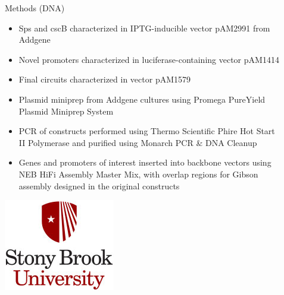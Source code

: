 \documentclass[final]{beamer}
\newlength{\sepwid}
\newlength{\onecolwid}
\newlength{\twocolwid}
\begin{document}
\begin{frame}[t]
\begin{columns}[t]
\begin{column}{\twocolwid}
\begin{columns}[t,totalwidth=\twocolwid]
\begin{column}{\onecolwid}
\begin{block}{Methods (DNA)}
\begin{itemize}
\item Sps and cscB characterized in IPTG-inducible vector pAM2991 from Addgene
\item Novel promoters characterized in luciferase-containing vector pAM1414
\item Final circuits characterized in vector pAM1579
\item Plasmid miniprep from Addgene cultures using Promega PureYield Plasmid Miniprep System
\item PCR of constructs performed using Thermo Scientific Phire Hot Start II Polymerase and purified using Monarch PCR \& DNA Cleanup
\item Genes and promoters of interest inserted into backbone vectors using NEB HiFi Assembly Master Mix, with overlap regions for Gibson assembly designed in the original constructs
\end{itemize}

\vspace{80pt}

\begin{center}
\includegraphics[width=0.6\linewidth]{sbu_logo.jpg}
\end{center}

\end{block}

\end{column} %

\end{columns} %

\end{column} %

\begin{column}{\sepwid}\end{column} %

\begin{column}{\onecolwid} %


\end{column}
\end{columns}
\end{frame}
\end{document}
